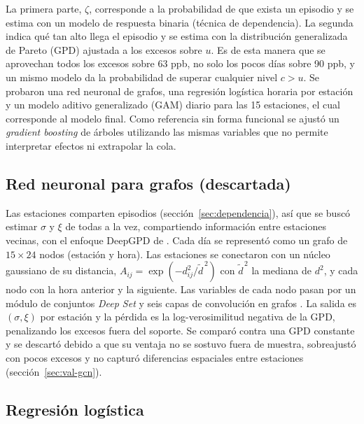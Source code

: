 \documentclass[11pt]{article}
\begin{document}
La primera parte, $\zeta$, corresponde a la probabilidad de que exista un episodio y se estima con un modelo de respuesta binaria (técnica de dependencia). La segunda indica qué tan alto llega el episodio y se estima con la distribución generalizada de Pareto (GPD) ajustada a los excesos sobre $u$. Es de esta manera que se aprovechan todos los excesos sobre 63 ppb, no solo los pocos días sobre 90 ppb, y un mismo modelo da la probabilidad de superar cualquier nivel $c>u$. Se probaron una red neuronal de grafos, una regresión logística horaria por estación y un modelo aditivo generalizado (GAM) diario para las 15 estaciones, el cual corresponde al modelo final. Como referencia sin forma funcional se ajustó un \textit{gradient boosting} de árboles \citep{friedman2001} utilizando las mismas variables que no permite interpretar efectos ni extrapolar la cola. 

\subsection{Red neuronal para grafos (descartada)}
\label{sec:mod-gcn}

Las estaciones comparten episodios (sección~\ref{sec:dependencia}), así que se buscó estimar $\sigma$ y $\xi$ de todas a la vez, compartiendo información entre estaciones vecinas, con el enfoque DeepGPD de \citet{wilson2022deepgpd}. Cada día se representó como un grafo de $15\times24$ nodos (estación y hora). Las estaciones se conectaron con un núcleo gaussiano de su distancia, $A_{ij}=\exp(-d_{ij}^2/\tilde d^{\,2})$ con $\tilde d^{\,2}$ la mediana de $d^2$, y cada nodo con la hora anterior y la siguiente. Las variables de cada nodo pasan por un módulo de conjuntos \textit{Deep Set} y seis capas de convolución en grafos \citep{kipf2017gcn}. La salida es $(\sigma,\xi)$ por estación y la pérdida es la log-verosimilitud negativa de la GPD, penalizando los excesos fuera del soporte. Se comparó contra una GPD constante y se descartó debido a que su ventaja no se sostuvo fuera de muestra, sobreajustó con pocos excesos y no capturó diferencias espaciales entre estaciones (sección~\ref{sec:val-gcn}).

\subsection{Regresión logística}
\label{sec:mod-logit}
\end{document}
